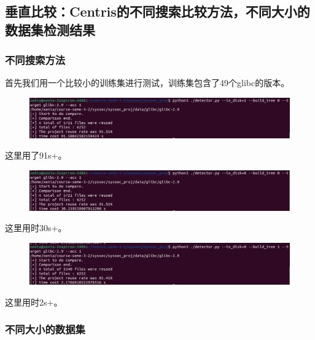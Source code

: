 \documentclass{cjc}
\begin{document}
\subsection{ 垂直比较：Centris的不同搜索比较方法，不同大小的数据集检测结果}
\subsubsection{ 不同搜索方法}
首先我们用一个比较小的训练集进行测试，训练集包含了49个glibc的版本。
\begin{figure}[htb]
  \centering
  \includegraphics[width=\linewidth]{pics/image-20220622221558771.png}
\end{figure}

   这里用了91s+。


\begin{figure}[htb]
  \centering
  \includegraphics[width=\linewidth]{pics/image-20220622221549800.png}
\end{figure}

   这里用时30s+。

\begin{figure}[htb]
  \centering
  \includegraphics[width=\linewidth]{pics/image-20220622221526098.png}
\end{figure}

   这里用时2s+。

   

\subsubsection{ 不同大小的数据集}
\end{document}
